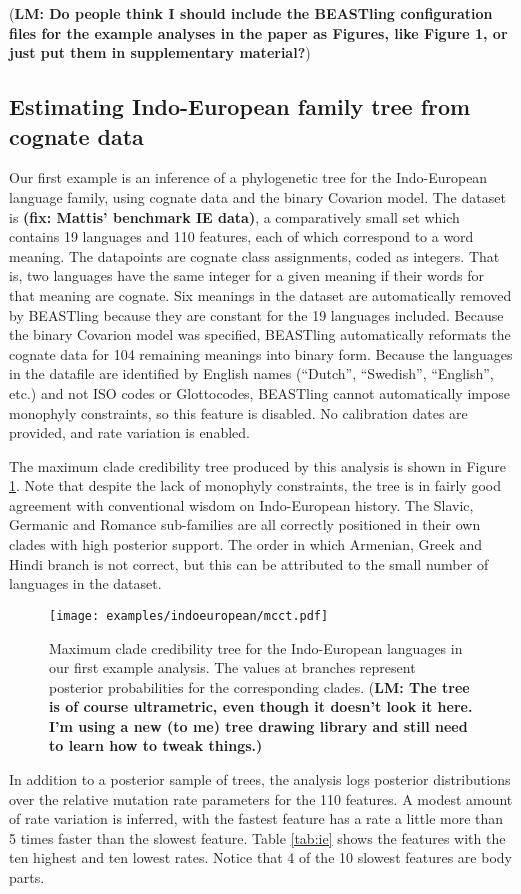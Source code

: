\documentclass[twocolumn,10pt]{scrartcl}
\begin{document}
(\textbf{LM: Do people think I should include the BEASTling configuration files for the example analyses in the paper as Figures, like Figure 1, or just put them in supplementary material?})

\subsection{Estimating Indo-European family tree from cognate data}

Our first example is an inference of a phylogenetic tree for the Indo-European language family, using cognate data and the binary Covarion model.  The dataset is \textbf{(fix: Mattis' benchmark IE data)}, a comparatively small set which contains 19 languages and 110 features, each of which correspond to a word meaning.  The datapoints are cognate class assignments, coded as integers.  That is, two languages have the same integer for a given meaning if their words for that meaning are cognate.  Six meanings in the dataset are automatically removed by BEASTling because they are constant for the 19 languages included.  Because the binary Covarion model was specified, BEASTling automatically reformats the cognate data for 104 remaining meanings into binary form.  Because the languages in the datafile are identified by English names (``Dutch'', ``Swedish'', ``English'', etc.) and not ISO codes or Glottocodes, BEASTling cannot automatically impose monophyly constraints, so this feature is disabled.  No calibration dates are provided, and rate variation is enabled.

The maximum clade credibility tree produced by this analysis is shown in Figure \ref{fig:ie}.  Note that despite the lack of monophyly constraints, the tree is in fairly good agreement with conventional wisdom on Indo-European history.  The Slavic, Germanic and Romance sub-families are all correctly positioned in their own clades with high posterior support.  The order in which Armenian, Greek and Hindi branch is not correct, but this can be attributed to the small number of languages in the dataset.

\begin{figure}[t]
	\texttt{[image: examples/indoeuropean/mcct.pdf]}
	\caption{Maximum clade credibility tree for the Indo-European languages in our first example analysis.  The values at branches represent posterior probabilities for the corresponding clades. (\textbf{LM: The tree is of course ultrametric, even though it doesn't look it here.  I'm using a new (to me) tree drawing library and still need to learn how to tweak things.)}}
\label{fig:ie}
\end{figure}
In addition to a posterior sample of trees, the analysis logs posterior distributions over the relative mutation rate parameters for the 110 features.  A modest amount of rate variation is inferred, with the fastest feature has a rate a little more than 5 times faster than the slowest feature.  Table \ref{tab:ie} shows the features with the ten highest and ten lowest rates.  Notice that 4 of the 10 slowest features are body parts.
\end{document}
